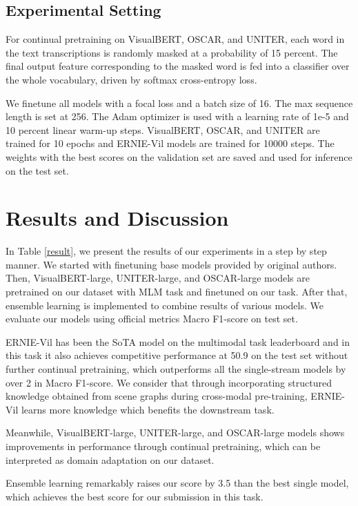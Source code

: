 \documentclass[11pt]{article}
\begin{document}
\subsection{Experimental Setting}
For continual pretraining on VisualBERT, OSCAR, and UNITER, each word in the text transcriptions is randomly masked at a probability of 15 percent. The final output feature corresponding to the masked word is fed into a classifier over the whole vocabulary, driven by softmax cross-entropy loss.

We finetune all models with a focal loss \citep{lin2017focal} and a batch size of 16. The max sequence length is set at 256. The Adam optimizer is used with a learning rate of 1e-5 and 10 percent linear warm-up steps. VisualBERT, OSCAR, and UNITER are trained for 10 epochs and ERNIE-Vil models are trained for 10000 steps. The weights with the best scores on the validation set are saved and used for inference on the test set.




\section{Results and Discussion}

In Table \ref{result}, we present the results of our experiments in a step by step manner. We started with finetuning base models provided by original authors. Then, VisualBERT-large, UNITER-large, and OSCAR-large models are pretrained on our dataset with MLM task and finetuned on our task. After that, ensemble learning is implemented to combine results of various models. We evaluate our models using official metrics Macro F1-score on test set.

ERNIE-Vil has been the SoTA model on the multimodal task leaderboard and in this task it also achieves competitive performance at 50.9 on the test set without further continual pretraining, which outperforms all the single-stream models by over 2 in Macro F1-score. We consider that through incorporating structured knowledge obtained from scene graphs during cross-modal pre-training, ERNIE-Vil learns more knowledge which benefits the downstream task. 

Meanwhile, VisualBERT-large, UNITER-large, and OSCAR-large models shows improvements in performance through continual pretraining, which can be interpreted as domain adaptation on our dataset. 

Ensemble learning remarkably raises our score by 3.5 than the best single model, which achieves the best score for our submission in this task. 
\end{document}
